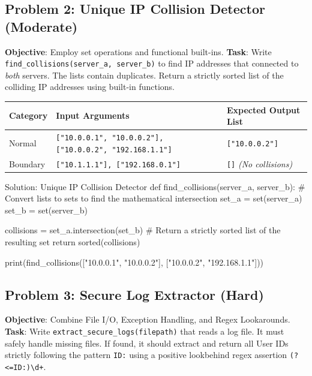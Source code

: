 \subsection*{Problem 2: Unique IP Collision Detector (Moderate)}
\textbf{Objective}: Employ set operations and functional built-ins.
\textbf{Task}: Write \texttt{find\_collisions(server\_a, server\_b)} to find IP addresses that connected to \textit{both} servers. The lists contain duplicates. Return a strictly sorted list of the colliding IP addresses using built-in functions.

\begin{table}[htbp]
\centering
\small
\begin{tabularx}{\linewidth}{lXl}
\toprule
\textbf{Category} & \textbf{Input Arguments} & \textbf{Expected Output List} \\
\midrule
Normal & \texttt{["10.0.0.1", "10.0.0.2"], ["10.0.0.2", "192.168.1.1"]} & \texttt{["10.0.0.2"]} \\
Boundary & \texttt{["10.1.1.1"], ["192.168.0.1"]} & \texttt{[]} \textit{(No collisions)} \\
\bottomrule
\end{tabularx}
\end{table}

\begin{pythoncode}[]{Solution: Unique IP Collision Detector}
def find_collisions(server_a, server_b):
    # Convert lists to sets to find the mathematical intersection
    set_a = set(server_a)
    set_b = set(server_b)
    
    collisions = set_a.intersection(set_b)
    # Return a strictly sorted list of the resulting set
    return sorted(collisions)

print(find_collisions(["10.0.0.1", "10.0.0.2"], ["10.0.0.2", "192.168.1.1"]))
\end{pythoncode}
\begin{outputbox}
['10.0.0.2']
\end{outputbox}

\subsection*{Problem 3: Secure Log Extractor (Hard)}
\textbf{Objective}: Combine File I/O, Exception Handling, and Regex Lookarounds.
\textbf{Task}: Write \texttt{extract\_secure\_logs(filepath)} that reads a log file. It must safely handle missing files. If found, it should extract and return all User IDs strictly following the pattern \texttt{ID:} using a positive lookbehind regex assertion \texttt{(?<=ID:)\textbackslash d+}.

